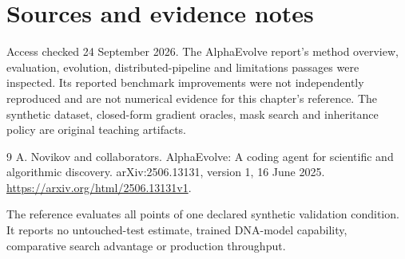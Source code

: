 \chapter*{Sources and evidence notes}
Access checked 24 September 2026. The AlphaEvolve report's method overview,
evaluation, evolution, distributed-pipeline and limitations passages were
inspected. Its reported benchmark improvements were not independently
reproduced and are not numerical evidence for this chapter's reference.
The synthetic dataset, closed-form gradient oracles, mask search and
inheritance policy are original teaching artifacts.
\begingroup\let\chapter\section
\begin{thebibliography}{9}
 A. Novikov and collaborators.
AlphaEvolve: A coding agent for scientific and algorithmic discovery.
arXiv:2506.13131, version 1, 16 June 2025.
\url{https://arxiv.org/html/2506.13131v1}.
\end{thebibliography}
\endgroup
The reference evaluates all points of one declared synthetic validation
condition. It reports no untouched-test estimate, trained DNA-model
capability, comparative search advantage or production throughput.
